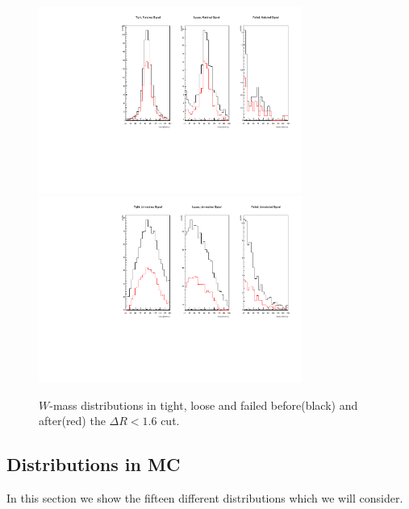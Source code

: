 \begin{figure}[h!]
\centering
        \includegraphics[width=0.77\textwidth]{EXO-12-024/figs/WtagSF/sigproof.pdf}
        \includegraphics[width=0.77\textwidth]{EXO-12-024/figs/WtagSF/sigproofII.pdf}
    \caption{$W$-mass distributions in tight, loose and failed before(black) and after(red) the $\Delta R < 1.6$ cut.}\label{fig:drproof}
\end{figure}
\subsection{Distributions in MC}
In this section we show the fifteen different distributions which we will consider.
